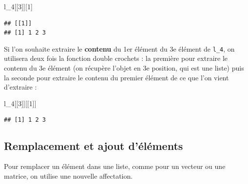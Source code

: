 \documentclass[
  11pt,
]{book}
\newenvironment{Shaded}{\begin{snugshade}}{\end{snugshade}}
\newcommand{\DecValTok}[1]{\textcolor[rgb]{0.00,0.00,0.81}{#1}}
\newcommand{\FunctionTok}[1]{\textcolor[rgb]{0.13,0.29,0.53}{\textbf{#1}}}
\newcommand{\NormalTok}[1]{#1}
\newcommand{\OtherTok}[1]{\textcolor[rgb]{0.56,0.35,0.01}{#1}}
\newcommand{\SpecialCharTok}[1]{\textcolor[rgb]{0.81,0.36,0.00}{\textbf{#1}}}
\newcommand{\StringTok}[1]{\textcolor[rgb]{0.31,0.60,0.02}{#1}}
\numberwithin{equation}{section}
\numberwithin{countremarque}{section}
\begin{document}
\begin{Shaded}
\begin{Highlighting}[]
\NormalTok{l\_4[[}\DecValTok{3}\NormalTok{]][}\DecValTok{1}\NormalTok{]}
\end{Highlighting}
\end{Shaded}

\begin{lstlisting}
## [[1]]
## [1] 1 2 3
\end{lstlisting}

Si l'on souhaite extraire le \textbf{contenu} du 1er élément du 3e élément de \texttt{l\_4}, on utilisera deux fois la fonction double crochets : la première pour extraire le contenu du 3e élément (on récupère l'objet en 3e position, qui est une liste) puis la seconde pour extraire le contenu du premier élément de ce que l'on vient d'extraire :

\begin{Shaded}
\begin{Highlighting}[]
\NormalTok{l\_4[[}\DecValTok{3}\NormalTok{]][[}\DecValTok{1}\NormalTok{]]}
\end{Highlighting}
\end{Shaded}

\begin{lstlisting}
## [1] 1 2 3
\end{lstlisting}

\hypertarget{remplacement-et-ajout-duxe9luxe9ments}{%
\subsection{Remplacement et ajout d'éléments}\label{remplacement-et-ajout-duxe9luxe9ments}}

Pour remplacer un élément dans une liste, comme pour un vecteur ou une matrice, on utilise une nouvelle affectation.

\begin{Shaded}
\end{Shaded}
\end{document}
